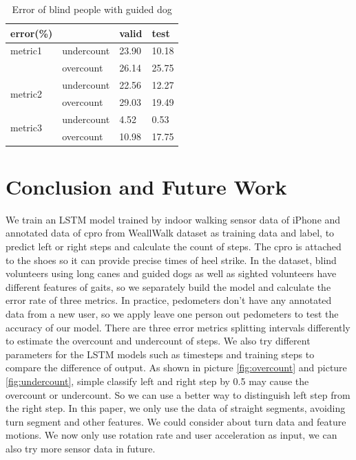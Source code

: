 \documentclass[11pt]{article}
\begin{document}
\begin{table}[]
\centering
\caption{Error of blind people with guided dog}
\label{my-label}
\begin{tabular}{llll}
\hline
error(\%)                &            & valid & test  \\ \hline
metric1                  & undercount & 23.90 & 10.18 \\
                         & overcount  & 26.14 & 25.75 \\ \hline
\multirow{2}{*}{metric2} & undercount & 22.56 & 12.27 \\
                         & overcount  & 29.03 & 19.49 \\ \hline
\multirow{2}{*}{metric3} & undercount & 4.52  & 0.53  \\
                         & overcount  & 10.98 & 17.75 \\ \hline
\end{tabular}
\end{table}


\section{Conclusion and Future Work}

We train an LSTM model trained by indoor walking sensor data of iPhone and annotated data of cpro from WeallWalk dataset as training data and label, to predict left or right steps and calculate the count of steps. The cpro is attached to the shoes so it can provide precise times of heel strike. In the dataset, blind volunteers using long canes and guided dogs as well as sighted volunteers have different features of gaits, so we separately build the model and calculate the error rate of three metrics. In practice, pedometers don't have any annotated data from a new user, so we apply leave one person out pedometers to test the accuracy of our model. There are three error metrics splitting intervals differently to estimate the overcount and undercount of steps. We also try different parameters for the LSTM models such as timesteps and training steps to compare the difference of output. As shown in picture \ref{fig:overcount} and picture \ref{fig:undercount}, simple classify left and right step by 0.5 may cause the overcount or undercount. So we can use a better way to distinguish left step from the right step. In this paper, we only use the data of straight segments, avoiding turn segment and other features. We could consider about turn data and feature motions. We now only use rotation rate and user acceleration as input, we can also try more sensor data in future.
\end{document}
